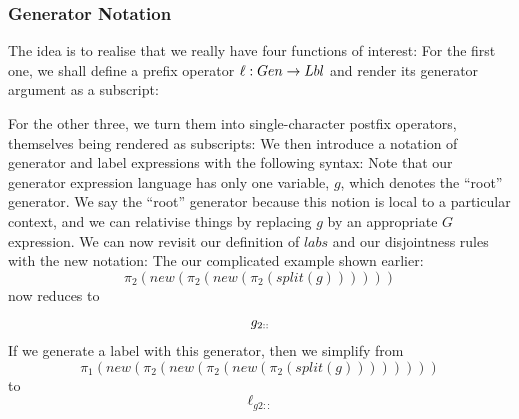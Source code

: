 \subsubsection{Generator Notation}

The idea is to realise that we really have four functions of interest:
For the first one, we shall define a prefix operator $\ell : Gen \rightarrow Lbl$
and render its generator argument as a subscript:

For the other three, we turn them into single-character postfix operators,
themselves being rendered as subscripts:
We then introduce a notation of generator and label expressions
with the following syntax:
Note that our generator expression language has only one variable, $g$,
which denotes the ``root'' generator.
We say the  ``root'' generator because this notion is local to a
particular context, and we can relativise things by replacing $g$
by an appropriate $G$ expression.
We can now revisit our definition of $labs$ and our disjointness rules
with the new notation:
The our complicated example shown earlier:
\[
\pi_2(new(\pi_2(new(\pi_2(split(g))))))
\]
now reduces to
\[
  g_{2::}
\]
If we generate a label with this generator,
then we simplify from
\[
\pi_1(new(\pi_2(new(\pi_2(new(\pi_2(split(g))))))))
\]
to
\[
  \ell_{g2::}
\]

